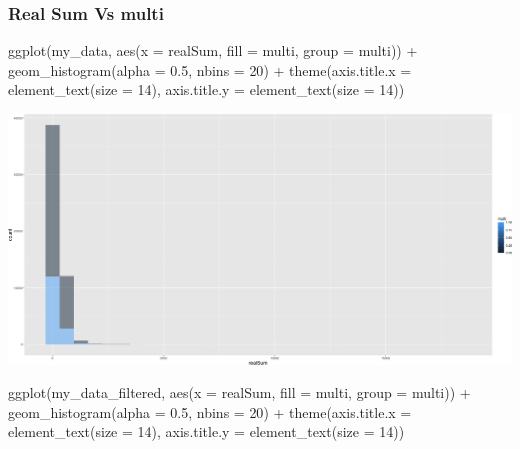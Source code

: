 \documentclass[
]{article}
\newenvironment{Shaded}{\begin{snugshade}}{\end{snugshade}}
\newcommand{\AttributeTok}[1]{\textcolor[rgb]{0.77,0.63,0.00}{#1}}
\newcommand{\DecValTok}[1]{\textcolor[rgb]{0.00,0.00,0.81}{#1}}
\newcommand{\FloatTok}[1]{\textcolor[rgb]{0.00,0.00,0.81}{#1}}
\newcommand{\FunctionTok}[1]{\textcolor[rgb]{0.00,0.00,0.00}{#1}}
\newcommand{\NormalTok}[1]{#1}
\newcommand{\SpecialCharTok}[1]{\textcolor[rgb]{0.00,0.00,0.00}{#1}}
\begin{document}
\hypertarget{real-sum-vs-multi}{%
\subsubsection{Real Sum Vs multi}\label{real-sum-vs-multi}}

\begin{Shaded}
\begin{Highlighting}[]
\FunctionTok{ggplot}\NormalTok{(my\_data, }\FunctionTok{aes}\NormalTok{(}\AttributeTok{x =}\NormalTok{ realSum, }\AttributeTok{fill =}\NormalTok{ multi, }\AttributeTok{group =}\NormalTok{ multi)) }\SpecialCharTok{+}
    \FunctionTok{geom\_histogram}\NormalTok{(}\AttributeTok{alpha =} \FloatTok{0.5}\NormalTok{, }\AttributeTok{nbins =} \DecValTok{20}\NormalTok{) }\SpecialCharTok{+} \FunctionTok{theme}\NormalTok{(}\AttributeTok{axis.title.x =} \FunctionTok{element\_text}\NormalTok{(}\AttributeTok{size =} \DecValTok{14}\NormalTok{),}
    \AttributeTok{axis.title.y =} \FunctionTok{element\_text}\NormalTok{(}\AttributeTok{size =} \DecValTok{14}\NormalTok{))}
\end{Highlighting}
\end{Shaded}

\includegraphics{Project_files/figure-latex/unnamed-chunk-21-1.png}

\begin{Shaded}
\begin{Highlighting}[]
\FunctionTok{ggplot}\NormalTok{(my\_data\_filtered, }\FunctionTok{aes}\NormalTok{(}\AttributeTok{x =}\NormalTok{ realSum, }\AttributeTok{fill =}\NormalTok{ multi, }\AttributeTok{group =}\NormalTok{ multi)) }\SpecialCharTok{+}
    \FunctionTok{geom\_histogram}\NormalTok{(}\AttributeTok{alpha =} \FloatTok{0.5}\NormalTok{, }\AttributeTok{nbins =} \DecValTok{20}\NormalTok{) }\SpecialCharTok{+} \FunctionTok{theme}\NormalTok{(}\AttributeTok{axis.title.x =} \FunctionTok{element\_text}\NormalTok{(}\AttributeTok{size =} \DecValTok{14}\NormalTok{),}
    \AttributeTok{axis.title.y =} \FunctionTok{element\_text}\NormalTok{(}\AttributeTok{size =} \DecValTok{14}\NormalTok{))}
\end{Highlighting}
\end{Shaded}
\end{document}
